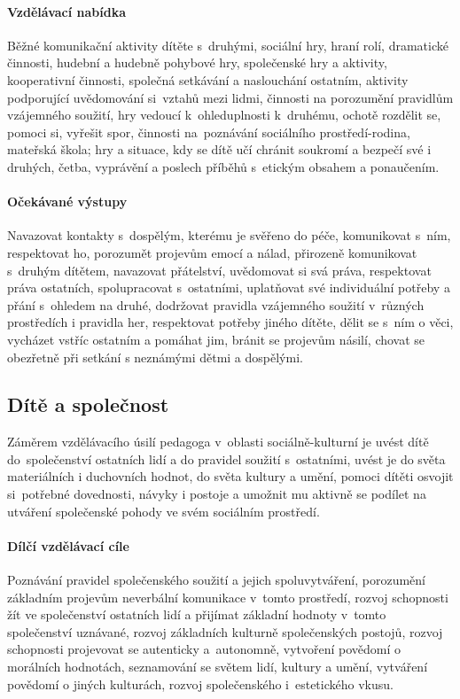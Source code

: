					\paragraph{Vzdělávací nabídka}
						Běžné komunikační aktivity dítěte s druhými, sociální hry, hraní rolí, dramatické činnosti, hudební a hudebně pohybové hry, společenské hry a aktivity, kooperativní činnosti, společná setkávání a naslouchání ostatním, aktivity podporující uvědomování si vztahů mezi lidmi, činnosti na porozumění pravidlům vzájemného soužití, hry vedoucí k ohleduplnosti k druhému, ochotě rozdělit se, pomoci si, vyřešit spor, činnosti na poznávání sociálního prostředí-rodina, mateřská škola; hry a situace, kdy se dítě učí chránit soukromí a bezpečí své i druhých, četba, vyprávění a poslech příběhů s etickým obsahem a ponaučením.
					\paragraph{Očekávané výstupy}
						Navazovat kontakty s dospělým, kterému je svěřeno do péče, komunikovat s ním, respektovat ho, porozumět projevům emocí a nálad, přirozeně komunikovat s druhým dítětem, navazovat přátelství, uvědomovat si svá práva, respektovat práva ostatních, spolupracovat s ostatními, uplatňovat své individuální potřeby a přání s ohledem na druhé, dodržovat pravidla vzájemného soužití v různých prostředích i pravidla her, respektovat potřeby jiného dítěte, dělit se s ním o věci, vycházet vstříc ostatním a pomáhat jim, bránit se projevům násilí, chovat se obezřetně při setkání s neznámými dětmi a dospělými.

			\subsection{Dítě a společnost}
				Záměrem vzdělávacího úsilí pedagoga v oblasti sociálně-kulturní je uvést dítě do společenství ostatních lidí a do pravidel soužití s ostatními, uvést je do světa materiálních i duchovních hodnot, do světa kultury a umění, pomoci dítěti osvojit si potřebné dovednosti, návyky i postoje a umožnit mu aktivně se podílet na utváření společenské pohody ve svém sociálním prostředí.
					\paragraph{Dílčí vzdělávací cíle}
						Poznávání pravidel společenského soužití a jejich spoluvytváření, porozumění základním projevům neverbální komunikace v tomto prostředí, rozvoj schopnosti žít ve společenství ostatních lidí a přijímat základní hodnoty v tomto společenství uznávané, rozvoj základních kulturně společenských postojů, rozvoj schopnosti projevovat se autenticky a autonomně, vytvoření povědomí o morálních hodnotách, seznamování se světem lidí, kultury a umění, vytváření povědomí o jiných kulturách, rozvoj společenského i estetického vkusu.

